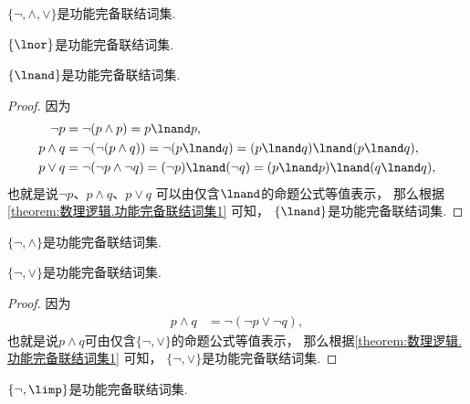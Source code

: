 \begin{theorem}\label{theorem:数理逻辑.功能完备联结词集1}
\(\{\neg,\land,\lor\}\)是功能完备联结词集.
\end{theorem}
\begin{corollary}
\(\{\lnor\}\)是功能完备联结词集.
\end{corollary}
\begin{corollary}
\(\{\lnand\}\)是功能完备联结词集.
\begin{proof}
因为\begin{align*}
	\neg p
	&= \neg(p \land p)
	= p \lnand p, \\
	p \land q
	&= \neg(\neg(p \land q))
	= \neg(p \lnand q)
	= (p \lnand q) \lnand (p \lnand q), \\
	p \lor q
	&= \neg(\neg p \land \neg q)
	= (\neg p) \lnand (\neg q)
	= (p \lnand p) \lnand (q \lnand q),
\end{align*}
也就是说\(\neg p\)、\(p \land q\)、\(p \lor q\)
可以由仅含\(\lnand\)的命题公式等值表示，
那么根据\cref{theorem:数理逻辑.功能完备联结词集1} 可知，
\(\{\lnand\}\)是功能完备联结词集.
\end{proof}
\end{corollary}
\begin{corollary}
\(\{\neg,\land\}\)是功能完备联结词集.
\end{corollary}
\begin{corollary}\label{theorem:数理逻辑.功能完备联结词集5}
\(\{\neg,\lor\}\)是功能完备联结词集.
\begin{proof}
因为\begin{align*}
	p \land q
	&= \neg(\neg p \lor \neg q),
\end{align*}
也就是说\(p \land q\)可由仅含\(\{\neg,\lor\}\)的命题公式等值表示，
那么根据\cref{theorem:数理逻辑.功能完备联结词集1} 可知，
\(\{\neg,\lor\}\)是功能完备联结词集.
\end{proof}
\end{corollary}
\begin{corollary}
\(\{\neg,\limp\}\)是功能完备联结词集.
\end{corollary}

